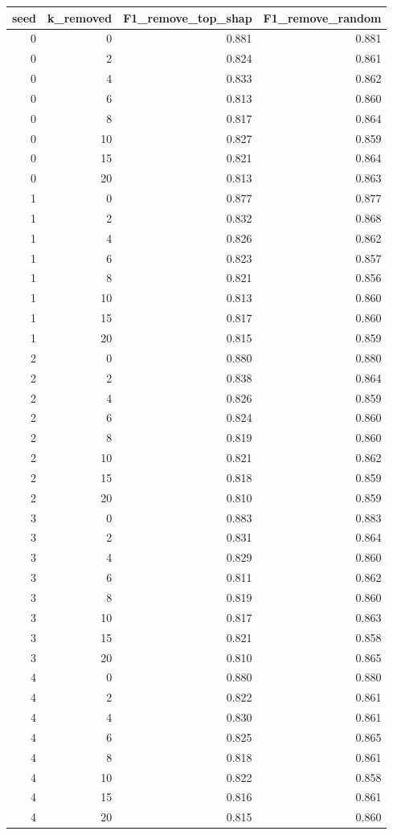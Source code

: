 \begin{tabular}{rrrr}
\toprule
seed & k_removed & F1_remove_top_shap & F1_remove_random \\
\midrule
0 & 0 & 0.881 & 0.881 \\
0 & 2 & 0.824 & 0.861 \\
0 & 4 & 0.833 & 0.862 \\
0 & 6 & 0.813 & 0.860 \\
0 & 8 & 0.817 & 0.864 \\
0 & 10 & 0.827 & 0.859 \\
0 & 15 & 0.821 & 0.864 \\
0 & 20 & 0.813 & 0.863 \\
1 & 0 & 0.877 & 0.877 \\
1 & 2 & 0.832 & 0.868 \\
1 & 4 & 0.826 & 0.862 \\
1 & 6 & 0.823 & 0.857 \\
1 & 8 & 0.821 & 0.856 \\
1 & 10 & 0.813 & 0.860 \\
1 & 15 & 0.817 & 0.860 \\
1 & 20 & 0.815 & 0.859 \\
2 & 0 & 0.880 & 0.880 \\
2 & 2 & 0.838 & 0.864 \\
2 & 4 & 0.826 & 0.859 \\
2 & 6 & 0.824 & 0.860 \\
2 & 8 & 0.819 & 0.860 \\
2 & 10 & 0.821 & 0.862 \\
2 & 15 & 0.818 & 0.859 \\
2 & 20 & 0.810 & 0.859 \\
3 & 0 & 0.883 & 0.883 \\
3 & 2 & 0.831 & 0.864 \\
3 & 4 & 0.829 & 0.860 \\
3 & 6 & 0.811 & 0.862 \\
3 & 8 & 0.819 & 0.860 \\
3 & 10 & 0.817 & 0.863 \\
3 & 15 & 0.821 & 0.858 \\
3 & 20 & 0.810 & 0.865 \\
4 & 0 & 0.880 & 0.880 \\
4 & 2 & 0.822 & 0.861 \\
4 & 4 & 0.830 & 0.861 \\
4 & 6 & 0.825 & 0.865 \\
4 & 8 & 0.818 & 0.861 \\
4 & 10 & 0.822 & 0.858 \\
4 & 15 & 0.816 & 0.861 \\
4 & 20 & 0.815 & 0.860 \\
\bottomrule
\end{tabular}
